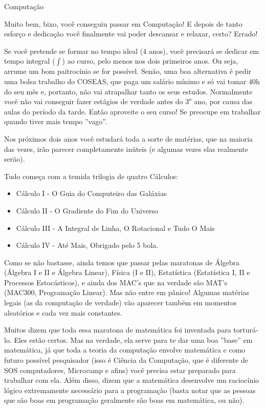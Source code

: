 \begin{subsecao}{Computação}

Muito bem, bixo, você conseguiu passar em Computação! E depois de tanto esforço
e dedicação você finalmente vai poder descansar e relaxar, certo? Errado!

Se você pretende se formar no tempo ideal (4 anos), você precisará se dedicar
em tempo integral ($\int$) ao curso, pelo menos nos dois primeiros anos. Ou
seja, arrume um bom paitrocínio se for possível. Senão, uma boa alternativa é
pedir uma bolsa trabalho do COSEAS, que paga um salário mínimo e só vai
tomar 40h do seu mês e, portanto, não vai atrapalhar tanto os seus estudos.
Normalmente você não vai conseguir fazer estágios de verdade antes do $3^{o}$
ano, por causa das aulas do período da tarde. Então aproveite o seu curso! Se
preocupe em trabalhar quando tiver mais tempo ''vago''.

Nos próximos dois anos você estudará toda a sorte de matérias, que na maioria
das vezes, irão parecer completamente inúteis (e algumas vezes elas realmente
serão).

Tudo começa com a temida trilogia de quatro Cálculos:
\begin{itemize}
\item Cálculo I - O Guia do Computeiro das Galáxias
\item Cálculo II - O Gradiente do Fim do Universo
\item Cálculo III - A Integral de Linha, O Rotacional e Tudo O Mais
\item Cálculo IV - Até Mais, Obrigado pelo 5 bola.
\end{itemize}

Como se não bastasse, ainda temos que passar pelas maratonas
de Álgebra (Álgebra I e II e Álgebra Linear), Física (I e II),
Estatística (Estatística I, II e Processos Estocásticos), e ainda dos MAC's que
na verdade são MAT's (MAC300, Programação Linear). Mas não entre em pânico!
Algumas matérias legais (as da computação de verdade) vão aparecer também em
momentos aleatórios e cada vez mais constantes.

Muitos dizem que toda essa maratona de matemática foi inventada para
torturá-lo. Eles estão certos. Mas na verdade, ela serve para te dar uma
boa ''base'' em matemática, já que toda a teoria da computação envolve
matemática e como futuro possível pesquisador (isso é Ciência da Computação,
que é diferente de SOS computadores, Microcamp e afins) você precisa estar
preparado para trabalhar com ela. Além disso, dizem que a matemática desenvolve
um raciocínio lógico extremamente necessário para a programação (basta notar
que as pessoas que são boas em programação geralmente são boas em matemática,
ou não).


\end{subsecao}
